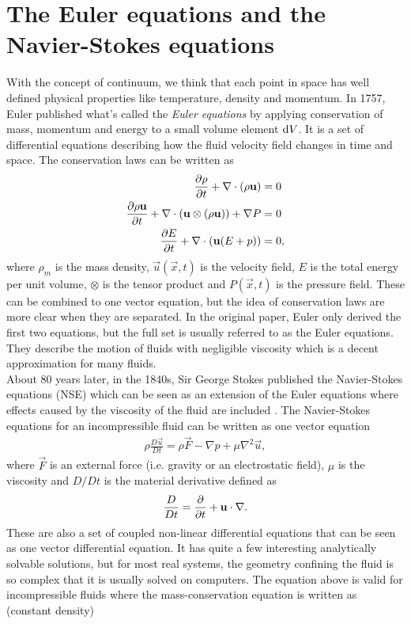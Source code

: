 \section{The Euler equations and the Navier-Stokes equations}
With the concept of continuum, we think that each point in space has well defined physical properties like temperature, density and momentum. In 1757, Euler published what's called the \textit{Euler equations} by applying conservation of mass, momentum and energy to a small volume element $\mathrm{d}V$. It is a set of differential equations describing how the fluid velocity field changes in time and space. The conservation laws can be written as
\begin{align}
	\frac{\partial \rho}{\partial t} + \nabla\cdot (\rho\mathbf u) &= 0\\
	\frac{\partial \rho \mathbf u}{\partial t} + \nabla \cdot (\mathbf u \otimes (\rho\mathbf u)) + \nabla P &= 0\\
	\frac{\partial E}{\partial t} + \nabla\cdot (\mathbf u(E + p)) &= 0,
\end{align}
where $\rho_m$ is the mass density, $\vec u(\vec x, t)$ is the velocity field, $E$ is the total energy per unit volume, $\otimes$ is the tensor product and $P(\vec x, t)$ is the pressure field. These can be combined to one vector equation, but the idea of conservation laws are more clear when they are separated. In the original paper, Euler only derived the first two equations, but the full set is usually referred to as the Euler equations. They describe the motion of fluids with negligible viscosity which is a decent approximation for many fluids.\\
About 80 years later, in the 1840s, Sir George Stokes published the Navier-Stokes equations (NSE) which can be seen as an extension of the Euler equations where effects caused by the viscosity of the fluid are included \cite{batchelor2000introduction}. The Navier-Stokes equations for an incompressible fluid can be written as one vector equation
\begin{align}
	\label{eq:nse_incompressible}
	\rho \frac{D\vec u}{Dt} = \rho \vec F - \nabla p + \mu\nabla^2\vec u,
\end{align}
where $\vec F$ is an external force (i.e. gravity or an electrostatic field), $\mu$ is the viscosity and $D/Dt$ is the material derivative defined as
\begin{align}
	{D\over Dt} = \frac{\partial }{\partial t} + \mathbf u\cdot \nabla.
\end{align}
These are also a set of coupled non-linear differential equations that can be seen as one vector differential equation. It has quite a few interesting analytically solvable solutions, but for most real systems, the geometry confining the fluid is so complex that it is usually solved on computers. The equation above is valid for incompressible fluids where the mass-conservation equation is written as (constant density)
